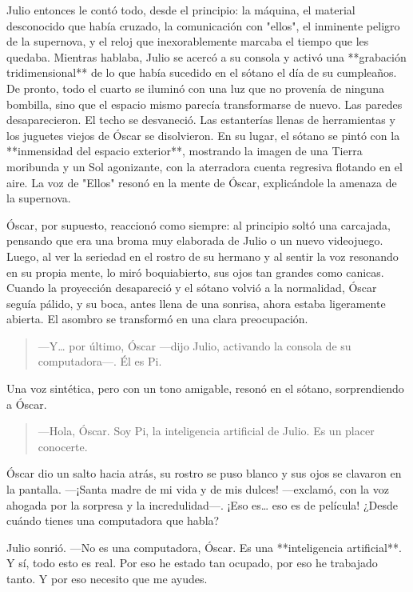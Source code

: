 \documentclass[a4paper,12pt]{book}
\begin{document}
Julio entonces le contó todo, desde el principio: la máquina, el material desconocido que había cruzado, la comunicación con "ellos", el inminente peligro de la supernova, y el reloj que inexorablemente marcaba el tiempo que les quedaba. Mientras hablaba, Julio se acercó a su consola y activó una **grabación tridimensional** de lo que había sucedido en el sótano el día de su cumpleaños. De pronto, todo el cuarto se iluminó con una luz que no provenía de ninguna bombilla, sino que el espacio mismo parecía transformarse de nuevo. Las paredes desaparecieron. El techo se desvaneció. Las estanterías llenas de herramientas y los juguetes viejos de Óscar se disolvieron. En su lugar, el sótano se pintó con la **inmensidad del espacio exterior**, mostrando la imagen de una Tierra moribunda y un Sol agonizante, con la aterradora cuenta regresiva flotando en el aire. La voz de "Ellos" resonó en la mente de Óscar, explicándole la amenaza de la supernova.

Óscar, por supuesto, reaccionó como siempre: al principio soltó una carcajada, pensando que era una broma muy elaborada de Julio o un nuevo videojuego. Luego, al ver la seriedad en el rostro de su hermano y al sentir la voz resonando en su propia mente, lo miró boquiabierto, sus ojos tan grandes como canicas. Cuando la proyección desapareció y el sótano volvió a la normalidad, Óscar seguía pálido, y su boca, antes llena de una sonrisa, ahora estaba ligeramente abierta. El asombro se transformó en una clara preocupación.

\begin{quote}
    —Y… por último, Óscar —dijo Julio, activando la consola de su computadora—. Él es Pi.
\end{quote}

Una voz sintética, pero con un tono amigable, resonó en el sótano, sorprendiendo a Óscar.

\begin{quote}
    —Hola, Óscar. Soy Pi, la inteligencia artificial de Julio. Es un placer conocerte.
\end{quote}

Óscar dio un salto hacia atrás, su rostro se puso blanco y sus ojos se clavaron en la pantalla. —¡Santa madre de mi vida y de mis dulces! —exclamó, con la voz ahogada por la sorpresa y la incredulidad—. ¡Eso es… eso es de película! ¿Desde cuándo tienes una computadora que habla?

Julio sonrió. —No es una computadora, Óscar. Es una **inteligencia artificial**. Y sí, todo esto es real. Por eso he estado tan ocupado, por eso he trabajado tanto. Y por eso necesito que me ayudes.
\end{document}
